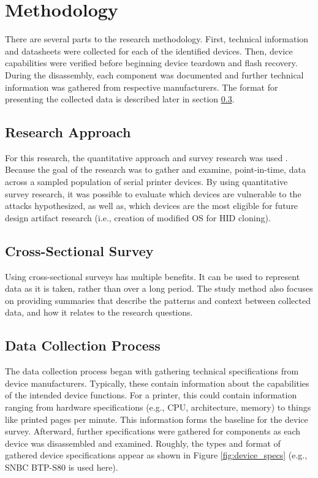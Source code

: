 \section*{Methodology}

There are several parts to the research methodology. First, technical information and datasheets were collected for each of the identified devices. Then, device capabilities were verified before beginning device teardown and flash recovery. During the disassembly, each component was documented and further technical information was gathered from respective manufacturers. The format for presenting the collected data is described later in section \ref{datacollectionprocess}.

\subsection{Research Approach} \label{researchapproach}

For this research, the quantitative approach and survey research was used \autocite{babbie2017basics,creswell2017research}. Because the goal of the research was to gather and examine, point-in-time, data across a sampled population of serial printer devices. By using quantitative survey research, it was possible to evaluate which devices are vulnerable to the attacks hypothesized, as well as, which devices are the most eligible for future design artifact research (i.e., creation of modified OS for HID cloning).


\subsection{Cross-Sectional Survey} \label{casestudy}

Using cross-sectional surveys \autocite{creswell2017research} has multiple benefits. It can be used to represent data as it is taken, rather than over a long period.  The study method also focuses on providing summaries that describe the patterns and context between collected data, and how it relates to the research questions.


\subsection{Data Collection Process} \label{datacollectionprocess}

The data collection process began with gathering technical specifications from device manufacturers. Typically, these contain information about the capabilities of the intended device functions. For a printer, this could contain information ranging from hardware specifications (e.g., CPU, architecture, memory) to things like printed pages per minute. This information forms the baseline for the device survey. Afterward, further specifications were gathered for components as each device was disassembled and examined. Roughly, the types and format of gathered device specifications appear as shown in Figure \ref{fig:device_specs} (e.g., SNBC BTP-S80 is used here).

